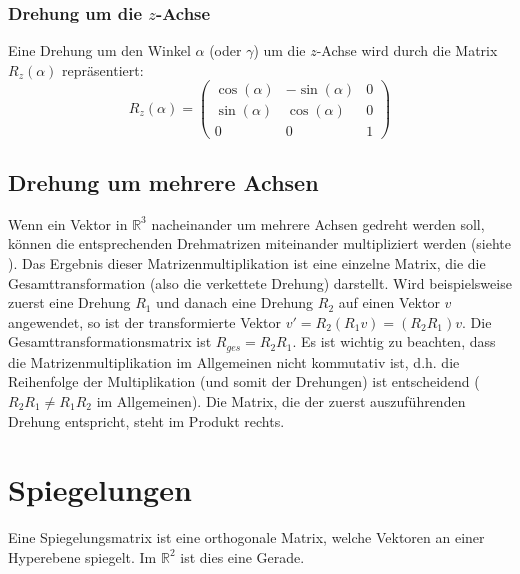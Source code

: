\subsubsection*{Drehung um die $z$-Achse}
Eine Drehung um den Winkel $\alpha$ (oder $\gamma$) um die $z$-Achse wird durch die Matrix $R_z(\alpha)$ repräsentiert:
\[
   R_z(\alpha) = \begin{pmatrix}
      \cos(\alpha) & -\sin(\alpha) & 0 \\
      \sin(\alpha) & \cos(\alpha)  & 0 \\
      0            & 0             & 1
   \end{pmatrix}
\]

\subsection{Drehung um mehrere Achsen}
Wenn ein Vektor in $\mathbb{R}^3$ nacheinander um mehrere Achsen gedreht werden
soll, können die entsprechenden Drehmatrizen miteinander multipliziert werden
(siehte ). Das Ergebnis dieser
Matrizenmultiplikation ist eine einzelne Matrix, die die Gesamttransformation
(also die verkettete Drehung) darstellt. Wird beispielsweise zuerst eine
Drehung $R_1$ und danach eine Drehung $R_2$ auf einen Vektor $v$ angewendet, so
ist der transformierte Vektor $v' = R_2 (R_1 v) = (R_2 R_1) v$. Die
Gesamttransformationsmatrix ist $R_{ges} = R_2 R_1$. Es ist wichtig zu
beachten, dass die Matrizenmultiplikation im Allgemeinen nicht kommutativ ist,
d.h. die Reihenfolge der Multiplikation (und somit der Drehungen) ist
entscheidend ($R_2 R_1 \neq R_1 R_2$ im Allgemeinen). Die Matrix, die der
zuerst auszuführenden Drehung entspricht, steht im Produkt rechts.

\section{Spiegelungen}

Eine Spiegelungsmatrix ist eine orthogonale Matrix, welche Vektoren an einer
Hyperebene spiegelt. Im $\mathbb{R}^2$ ist dies eine Gerade.

